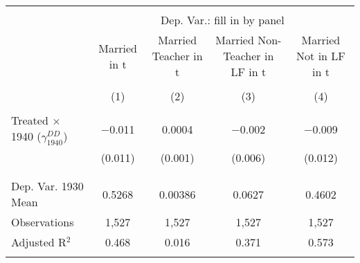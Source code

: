 
\begin{tabular}{@{\extracolsep{5pt}}lcccc} 
\\[-1.8ex]\hline 
\hline \\[-1.8ex] 
 & \multicolumn{4}{c}{Dep. Var.: fill in by panel} \\ 
\cline{2-5} 
 & Married in t & Married Teacher in t & Married Non-Teacher in LF in t & Married Not in LF in t \\ 
\\[-1.8ex] & (1) & (2) & (3) & (4)\\ 
\hline \\[-1.8ex] 
 Treated $\times$ 1940 ($\gamma_{1940}^{DD}$) & $-$0.011 & 0.0004 & $-$0.002 & $-$0.009 \\ 
  & (0.011) & (0.001) & (0.006) & (0.012) \\ 
  & & & & \\ 
\hline \\[-1.8ex] 
Dep. Var. 1930 Mean & 0.5268 & 0.00386 & 0.0627 & 0.4602 \\ 
Observations & 1,527 & 1,527 & 1,527 & 1,527 \\ 
Adjusted R$^{2}$ & 0.468 & 0.016 & 0.371 & 0.573 \\ 
\hline 
\hline \\[-1.8ex] 
\end{tabular} 
